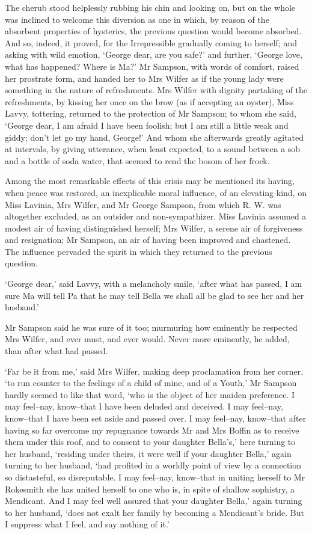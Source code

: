 The cherub stood helplessly rubbing his chin and looking on, but on the
whole was inclined to welcome this diversion as one in which, by reason
of the absorbent properties of hysterics, the previous question would
become absorbed. And so, indeed, it proved, for the Irrepressible
gradually coming to herself; and asking with wild emotion, ‘George dear,
are you safe?’ and further, ‘George love, what has happened? Where is
Ma?’ Mr Sampson, with words of comfort, raised her prostrate form, and
handed her to Mrs Wilfer as if the young lady were something in the
nature of refreshments. Mrs Wilfer with dignity partaking of the
refreshments, by kissing her once on the brow (as if accepting an
oyster), Miss Lavvy, tottering, returned to the protection of Mr
Sampson; to whom she said, ‘George dear, I am afraid I have been
foolish; but I am still a little weak and giddy; don’t let go my hand,
George!’ And whom she afterwards greatly agitated at intervals, by
giving utterance, when least expected, to a sound between a sob and a
bottle of soda water, that seemed to rend the bosom of her frock.

Among the most remarkable effects of this crisis may be mentioned its
having, when peace was restored, an inexplicable moral influence, of an
elevating kind, on Miss Lavinia, Mrs Wilfer, and Mr George Sampson, from
which R. W. was altogether excluded, as an outsider and non-sympathizer.
Miss Lavinia assumed a modest air of having distinguished herself; Mrs
Wilfer, a serene air of forgiveness and resignation; Mr Sampson, an air
of having been improved and chastened. The influence pervaded the spirit
in which they returned to the previous question.

‘George dear,’ said Lavvy, with a melancholy smile, ‘after what has
passed, I am sure Ma will tell Pa that he may tell Bella we shall all be
glad to see her and her husband.’

Mr Sampson said he was sure of it too; murmuring how eminently he
respected Mrs Wilfer, and ever must, and ever would. Never more
eminently, he added, than after what had passed.

‘Far be it from me,’ said Mrs Wilfer, making deep proclamation from her
corner, ‘to run counter to the feelings of a child of mine, and of a
Youth,’ Mr Sampson hardly seemed to like that word, ‘who is the object
of her maiden preference. I may feel--nay, know--that I have been
deluded and deceived. I may feel--nay, know--that I have been set
aside and passed over. I may feel--nay, know--that after having so far
overcome my repugnance towards Mr and Mrs Boffin as to receive them
under this roof, and to consent to your daughter Bella’s,’ here turning
to her husband, ‘residing under theirs, it were well if your daughter
Bella,’ again turning to her husband, ‘had profited in a worldly
point of view by a connection so distasteful, so disreputable. I may
feel--nay, know--that in uniting herself to Mr Rokesmith she has united
herself to one who is, in spite of shallow sophistry, a Mendicant. And
I may feel well assured that your daughter Bella,’ again turning to her
husband, ‘does not exalt her family by becoming a Mendicant’s bride. But
I suppress what I feel, and say nothing of it.’

